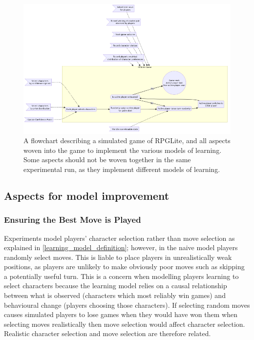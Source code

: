 \begin{figure}[h]
  \centering
  \includegraphics[width=\columnwidth]{60_optimisation_with_aspects/diagrams/aspect_applied_model.png}
  \caption{A flowchart describing a simulated game of RPGLite, and all aspects woven into the game to implement the various models of learning. Some aspects should not be woven together in the same experimental run, as they implement different models of learning.}
  \label{fig:all_aspects_applied}
\end{figure}


\subsection{Aspects for model improvement}\label{subsec:aspects_improving_model}

\subsubsection{Ensuring the Best Move is Played}\label{aspect_to_ensure_best_move}



Experiments model players' character selection rather than move selection as
explained in \cref{learning_model_definition}; however, in the naive model
players randomly select moves. This is liable to place players in
unrealistically weak positions, as players are unlikely to make obviously poor
moves such as skipping a potentially useful turn. This is a concern when
modelling players learning to select characters because the learning model
relies on a causal relationship between what is observed (characters which most
reliably win games) and behavioural change (players choosing those characters).
If selecting random moves causes simulated players to lose games when they would
have won them when selecting moves realistically then move selection would
affect character selection. Realistic character selection and move selection are
therefore related.

